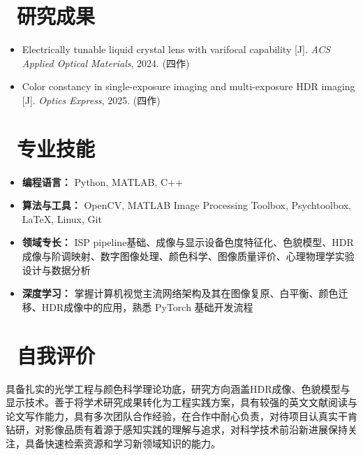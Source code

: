\documentclass[11pt]{article}
\begin{document}
\section{\makebox[\widthof{\faBook}][c]{\color{CVBlue}\faBook}\ 研究成果}
\begin{itemize}[nosep]
    \item Electrically tunable liquid crystal lens with varifocal capability [J]. \textit{ACS Applied Optical Materials}, 2024. (四作)
    \item Color constancy in single-exposure imaging and multi-exposure HDR imaging [J]. \textit{Optics Express}, 2025. (四作)
\end{itemize}

\section{\makebox[\widthof{\faCogs}][c]{\color{CVBlue}\faCogs}\ 专业技能}
\begin{itemize}[nosep]
    \item \textbf{编程语言：} Python, MATLAB, C++
    \item \textbf{算法与工具：} OpenCV, MATLAB Image Processing Toolbox, Psychtoolbox, LaTeX, Linux, Git
    \item \textbf{领域专长：} ISP pipeline基础、成像与显示设备色度特征化、色貌模型、HDR成像与阶调映射、数字图像处理、颜色科学、图像质量评价、心理物理学实验设计与数据分析
    \item \textbf{深度学习：} 掌握计算机视觉主流网络架构及其在图像复原、白平衡、颜色迁移、HDR成像中的应用，熟悉 PyTorch 基础开发流程
\end{itemize}

\section{\makebox[\widthof{\faInfo}][c]{\color{CVBlue}\faInfo}\ 自我评价}
具备扎实的光学工程与颜色科学理论功底，研究方向涵盖HDR成像、色貌模型与显示技术。善于将学术研究成果转化为工程实践方案，具有较强的英文文献阅读与论文写作能力，具有多次团队合作经验，在合作中耐心负责，对待项目认真实干肯钻研，对影像品质有着源于感知实践的理解与追求，对科学技术前沿新进展保持关注，具备快速检索资源和学习新领域知识的能力。
\end{document}
